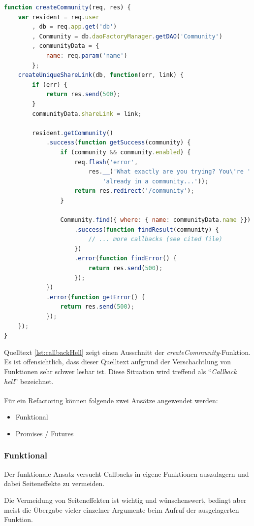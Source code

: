 \begin{lstlisting}[language=JavaScript, firstnumber=136, caption={Ausschnitt aus Community Controller mit Callback Hell \cite{milestone7CommunityController}}, label={lst:callbackHell}]
function createCommunity(req, res) {
	var resident = req.user
		, db = req.app.get('db')
		, Community = db.daoFactoryManager.getDAO('Community')
		, communityData = {
			name: req.param('name')
		};
	createUniqueShareLink(db, function(err, link) {
		if (err) {
			return res.send(500);
		}
		communityData.shareLink = link;

		resident.getCommunity()
			.success(function getSuccess(community) {
				if (community && community.enabled) {
					req.flash('error',
						res.__('What exactly are you trying? You\'re ' +
							'already in a community...'));
					return res.redirect('/community');
				}

				Community.find({ where: { name: communityData.name }})
					.success(function findResult(community) {
						// ... more callbacks (see cited file)
					})
					.error(function findError() {
						return res.send(500);
					});
			})
			.error(function getError() {
				return res.send(500);
			});
	});
}
\end{lstlisting}

Quelltext \ref{lst:callbackHell} zeigt einen Ausschnitt der \emph{createCommunity}-Funktion. Es ist offensichtlich, dass dieser Quelltext aufgrund der Verschachtlung von Funktionen sehr schwer lesbar ist. Diese Situation wird treffend als ``\emph{Callback hell}'' bezeichnet.
\\ \\
Für ein Refactoring können folgende zwei Ansätze angewendet werden:

\begin{itemize}
	\item Funktional
	\item Promises / Futures
\end{itemize}

\subsubsection*{Funktional}
Der funktionale Ansatz versucht Callbacks in eigene Funktionen auszulagern und dabei Seiteneffekte zu vermeiden.

Die Vermeidung von Seiteneffekten ist wichtig und wünschenswert, bedingt aber meist die Übergabe vieler einzelner Argumente beim Aufruf der ausgelagerten Funktion.

